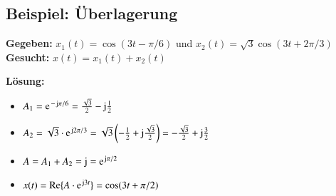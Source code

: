 \subsection{\textbf{Beispiel:} Überlagerung}
\textbf{Gegeben:} $x_1(t) = \cos(3t - \pi/6)$ und $x_2(t) = \sqrt{3}\cos(3t + 2\pi/3)$ \\
\textbf{Gesucht:} $x(t) = x_1(t) + x_2(t)$

\textbf{Lösung:}
\begin{itemize}
    \item[] $A_1 = \e^{-\jimg \pi/6} = \frac{\sqrt{3}}{2} - \jimg \frac{1}{2}$
    \item[] $A_2 = \sqrt{3}\cdot\e^{\jimg 2\pi/3} = \sqrt{3}\left(-\frac{1}{2} + \jimg \frac{\sqrt{3}}{2}\right) = -\frac{\sqrt{3}}{2} + \jimg \frac{3}{2}$
    \item[] $A = A_1 + A_2 = \jimg = \e^{\jimg \pi/2}$
    \item[] $x(t) = \RE\{ A \cdot \e^{\jimg 3t} \} = \cos(3t + \pi/2)$
\end{itemize}